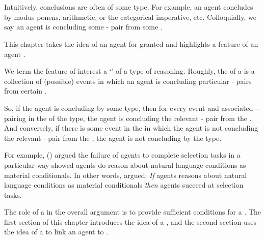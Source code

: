 \chapter{}
\label{cha:typical}
\label{idea:tC}

\nocite{Wilson:1994aa}
\nocite{Goodman:1983aa}

\begin{note}
  Intuitively, conclusions are often of some type.
  For example, an agent concludes by modus ponens, arithmetic, or the categorical imperative, etc.
  Colloquially, we say an agent is \emph{\typeAdj{}} concluding some - pair from some \pool{}.

  This chapter takes the idea of an agent \tCV{} for granted and highlights a feature of an agent \tCV{}.
\end{note}


\begin{note}
  We term the feature of interest a `\tpro{}' of a type of reasoning.
  Roughly, the \tpro{} of a \torN{} is a collection of (possible) events in which an agent is concluding particular - pairs from certain .

  So, if the agent is concluding by some type, then for every event and associated -- pairing in the \tpro{} of the type, the agent is concluding the relevant - pair from the .
  And conversely, if there is some event in the \tpro{} in which the agent is not concluding the relevant - pair from the , the agent is not concluding by the type.

  For example, \citeauthor{Wason:1966aa} (\citeyear{Wason:1966aa}) argued the failure of agents to complete selection tasks in a particular way showed agents do reason about natural language conditions as material conditionals.
  In other words, \citeauthor{Wason:1966aa} argued:
  \emph{If} agents reasons about natural language conditions as material conditionals \emph{then} agents succeed at selection tasks.
\end{note}


\begin{note}
  The role of a  in the overall argument is to provide sufficient conditions for a \requ{}.
  The first section of this chapter introduces the idea of a , and the second section uses the idea of a  to link an agent \tCN{} to \issueInclusion{}.
\end{note}


\section{}
\label{cha:typical:int}






